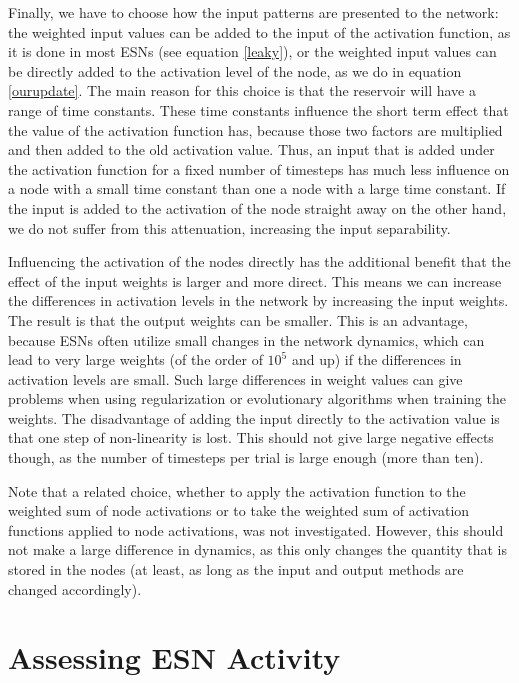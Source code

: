 \documentclass[10pt,a4paper]{report}
\begin{document}
Finally, we have to choose how the input patterns are presented to the network: the weighted input values can be added to the input of the activation function, as it is done in most ESNs (see equation \ref{leaky}), or the weighted input values can be directly added to the activation level of the node, as we do in equation \ref{ourupdate}. The main reason for this choice is that the reservoir will have a range of time constants. These time constants influence the short term effect that the value of the activation function has, because those two factors are multiplied and then added to the old activation value. Thus, an input that is added under the activation function for a fixed number of timesteps has much less influence on a node with a small time constant than one a node with a large time constant. If the input is added to the activation of the node straight away on the other hand, we do not suffer from this attenuation, increasing the input separability. 

Influencing the activation of the nodes directly has the additional benefit that the effect of the input weights is larger and more direct. This means we can increase the differences in activation levels in the network by increasing the input weights. The result is that the output weights can be smaller. This is an advantage, because ESNs often utilize small changes in the network dynamics, which can lead to very large weights (of the order of $10^{5}$ and up) if the differences in activation levels are small. Such large differences in weight values can give problems when using regularization or evolutionary algorithms when training the weights. The disadvantage of adding the input directly to the activation value is that one step of non-linearity is lost. This should not give large negative effects though, as the number of timesteps per trial is large enough (more than ten). 

Note that a related choice, whether to apply the activation function to the weighted sum of node activations or to take the weighted sum of activation functions applied to node activations, was not investigated. However, this should not make a large difference in dynamics, as this only changes the quantity that is stored in the nodes (at least, as long as the input and output methods are changed accordingly). 

\section{Assessing ESN Activity} 
\end{document}
